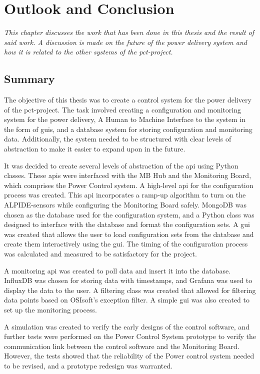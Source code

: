 \documentclass[main.tex]{subfiles}
\begin{document}
\section{Outlook and Conclusion}
\textit{This chapter discusses the work that has been done in this thesis and the result of said work. A discussion is made on the future of the power delivery system and how it is related to the other systems of the \gls{pct}-project.}

\subsection{Summary}

The objective of this thesis was to create a control system for the power delivery of the \gls{pct}-project. The task involved creating a configuration and monitoring system for the power delivery, A Human to Machine Interface to the system in the form of \gls{gui}s, and a database system for storing configuration and monitoring data. Additionally, the system needed to be structured with clear levels of abstraction to make it easier to expand upon in the future.

It was decided to create several levels of abstraction of the \gls{api} using Python classes. These \gls{api}s were interfaced with the MB Hub and the Monitoring Board, which comprises the Power Control system. A high-level \gls{api} for the configuration process was created. This \gls{api} incorporates a ramp-up algorithm to turn on the ALPIDE-sensors while configuring the Monitoring Board safely. MongoDB was chosen as the database used for the configuration system, and a Python class was designed to interface with the database and format the configuration sets. A \gls{gui} was created that allows the user to load configuration sets from the database and create them interactively using the \gls{gui}. The timing of the configuration process was calculated and measured to be satisfactory for the project.

A monitoring \gls{api} was created to poll data and insert it into the database. InfluxDB was chosen for storing data with timestamps, and Grafana was used to display the data to the user. A filtering class was created that allowed for filtering data points based on OSIsoft's exception filter. A simple \gls{gui} was also created to set up the monitoring process.

A simulation was created to verify the early designs of the control software, and further tests were performed on the Power Control System prototype to verify the communication link between the control software and the Monitoring Board. However, the tests showed that the reliability of the Power control system needed to be revised, and a prototype redesign was warranted.
\end{document}
